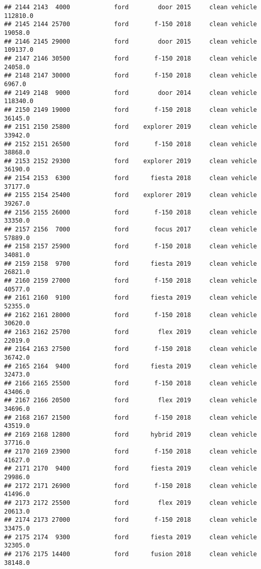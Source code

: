 \documentclass[
]{article}
\begin{document}
\begin{verbatim}
## 2144 2143  4000            ford        door 2015     clean vehicle  112810.0
## 2145 2144 25700            ford       f-150 2018     clean vehicle   19058.0
## 2146 2145 29000            ford        door 2015     clean vehicle  109137.0
## 2147 2146 30500            ford       f-150 2018     clean vehicle   24058.0
## 2148 2147 30000            ford       f-150 2018     clean vehicle    6967.0
## 2149 2148  9000            ford        door 2014     clean vehicle  118340.0
## 2150 2149 19000            ford       f-150 2018     clean vehicle   36145.0
## 2151 2150 25800            ford    explorer 2019     clean vehicle   33942.0
## 2152 2151 26500            ford       f-150 2018     clean vehicle   38868.0
## 2153 2152 29300            ford    explorer 2019     clean vehicle   36190.0
## 2154 2153  6300            ford      fiesta 2018     clean vehicle   37177.0
## 2155 2154 25400            ford    explorer 2019     clean vehicle   39267.0
## 2156 2155 26000            ford       f-150 2018     clean vehicle   33350.0
## 2157 2156  7000            ford       focus 2017     clean vehicle   57889.0
## 2158 2157 25900            ford       f-150 2018     clean vehicle   34081.0
## 2159 2158  9700            ford      fiesta 2019     clean vehicle   26821.0
## 2160 2159 27000            ford       f-150 2018     clean vehicle   40577.0
## 2161 2160  9100            ford      fiesta 2019     clean vehicle   52355.0
## 2162 2161 28000            ford       f-150 2018     clean vehicle   30620.0
## 2163 2162 25700            ford        flex 2019     clean vehicle   22019.0
## 2164 2163 27500            ford       f-150 2018     clean vehicle   36742.0
## 2165 2164  9400            ford      fiesta 2019     clean vehicle   32473.0
## 2166 2165 25500            ford       f-150 2018     clean vehicle   43406.0
## 2167 2166 20500            ford        flex 2019     clean vehicle   34696.0
## 2168 2167 21500            ford       f-150 2018     clean vehicle   43519.0
## 2169 2168 12800            ford      hybrid 2019     clean vehicle   37716.0
## 2170 2169 23900            ford       f-150 2018     clean vehicle   41627.0
## 2171 2170  9400            ford      fiesta 2019     clean vehicle   29986.0
## 2172 2171 26900            ford       f-150 2018     clean vehicle   41496.0
## 2173 2172 25500            ford        flex 2019     clean vehicle   20613.0
## 2174 2173 27000            ford       f-150 2018     clean vehicle   33475.0
## 2175 2174  9300            ford      fiesta 2019     clean vehicle   32305.0
## 2176 2175 14400            ford      fusion 2018     clean vehicle   38148.0

\end{verbatim}
\end{document}
